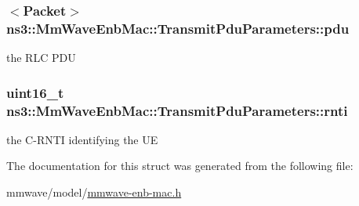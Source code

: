 \subsubsection[{\texorpdfstring{pdu}{pdu}}]{$<${\bf Packet}$>$ ns3\+::\+Mm\+Wave\+Enb\+Mac\+::\+Transmit\+Pdu\+Parameters\+::pdu}\hypertarget{structns3_1_1MmWaveEnbMac_1_1TransmitPduParameters_ae2207879499b0e96583e604b2ebbf70d}{}\label{structns3_1_1MmWaveEnbMac_1_1TransmitPduParameters_ae2207879499b0e96583e604b2ebbf70d}
the R\+LC P\+DU 
\subsubsection[{\texorpdfstring{rnti}{rnti}}]{\setlength{\rightskip}{0pt plus 5cm}uint16\+\_\+t ns3\+::\+Mm\+Wave\+Enb\+Mac\+::\+Transmit\+Pdu\+Parameters\+::rnti}\hypertarget{structns3_1_1MmWaveEnbMac_1_1TransmitPduParameters_a023abf8bed0e630826c100021acc8373}{}\label{structns3_1_1MmWaveEnbMac_1_1TransmitPduParameters_a023abf8bed0e630826c100021acc8373}
the C-\/\+R\+N\+TI identifying the UE 

The documentation for this struct was generated from the following file\+:\begin{DoxyCompactItemize}
\item 
mmwave/model/\hyperlink{mmwave-enb-mac_8h}{mmwave-\/enb-\/mac.\+h}\end{DoxyCompactItemize}
